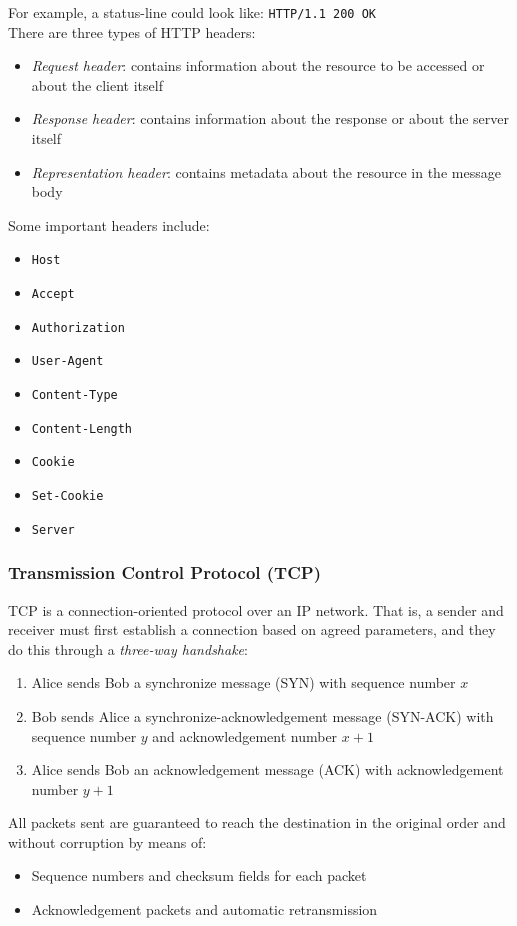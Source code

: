 \documentclass[12pt, titlepage]{article}
\begin{document}
For example, a status-line could look like: \texttt{HTTP/1.1 200 OK} \\

There are three types of HTTP headers:
\begin{itemize}
  \item \textit{Request header}: contains information about the resource to be accessed or about the client itself
  \item \textit{Response header}: contains information about the response or about the server itself
  \item \textit{Representation header}: contains metadata about the resource in the message body
\end{itemize}

Some important headers include:
\begin{itemize}
  \item \texttt{Host}
  \item \texttt{Accept}
  \item \texttt{Authorization}
  \item \texttt{User-Agent}
  \item \texttt{Content-Type}
  \item \texttt{Content-Length}
  \item \texttt{Cookie}
  \item \texttt{Set-Cookie}
  \item \texttt{Server}
\end{itemize}

\subsubsection{Transmission Control Protocol (TCP)}

TCP is a connection-oriented protocol over an IP network. That is, a sender and receiver must first establish a connection based on agreed parameters, and they do this through a \textit{three-way handshake}:
\begin{enumerate}
  \item Alice sends Bob a synchronize message (SYN) with sequence number $x$
  \item Bob sends Alice a synchronize-acknowledgement message (SYN-ACK) with sequence number $y$ and acknowledgement number $x+1$
  \item Alice sends Bob an acknowledgement message (ACK) with acknowledgement number $y+1$
\end{enumerate}

All packets sent are guaranteed to reach the destination in the original order and without corruption by means of:
\begin{itemize}
  \item Sequence numbers and checksum fields for each packet
  \item Acknowledgement packets and automatic retransmission
\end{itemize}
\end{document}

